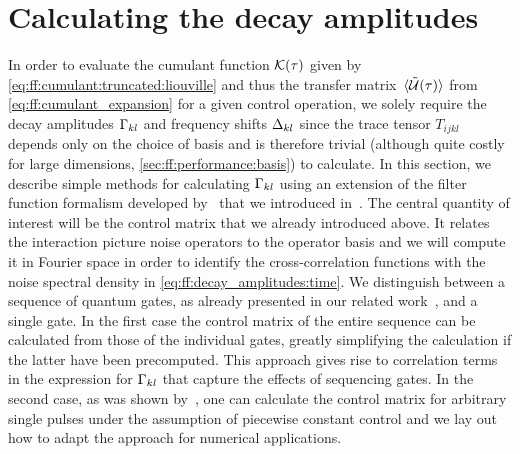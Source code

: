 
\section{Calculating the decay amplitudes}\label{sec:ff:theory:decay_amplitudes}
In order to evaluate the cumulant function $\mathcal{K}(\tau)$ given by \cref{eq:ff:cumulant:truncated:liouville} and thus the transfer matrix $\ev*{\liouvUe(\tau)}$ from \cref{eq:ff:cumulant_expansion} for a given control operation, we solely require the decay amplitudes $\Gamma_{kl}$ and frequency shifts $\Delta_{kl}$ since the trace tensor $T_{ijkl}$ depends only on the choice of basis and is therefore trivial (although quite costly for large dimensions, \cf \cref{sec:ff:performance:basis}) to calculate.
In this section, we describe simple methods for calculating $\Gamma_{kl}$ using an extension of the filter function formalism developed by~\citet{Green2013} that we introduced in~.
The central quantity of interest will be the control matrix that we already introduced above.
It relates the interaction picture noise operators to the operator basis and we will compute it in Fourier space in order to identify the cross-correlation functions with the noise spectral density in \cref{eq:ff:decay_amplitudes:time}.
We distinguish between a sequence of quantum gates, as already presented in our related work~\cite{Cerfontaine2021}, and a single gate.
In the first case the control matrix of the entire sequence can be calculated from those of the individual gates, greatly simplifying the calculation if the latter have been precomputed.
This approach gives rise to correlation terms in the expression for $\Gamma_{kl}$ that capture the effects of sequencing gates.
In the second case, as was shown by~\citet{Green2013}, one can calculate the control matrix for arbitrary single pulses under the assumption of piecewise constant control and we lay out how to adapt the approach for numerical applications.

